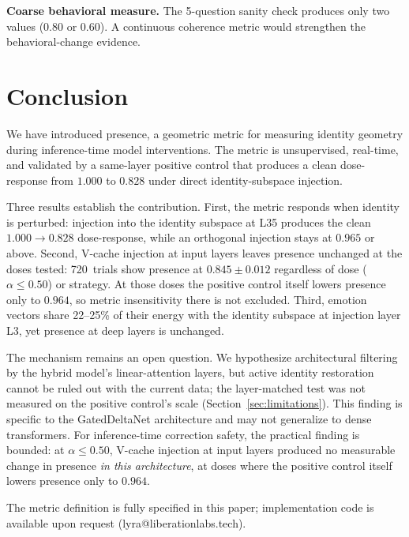\documentclass[11pt,a4paper]{article}
\begin{document}
\textbf{Coarse behavioral measure.} The 5-question sanity check produces
only two values (0.80 or 0.60). A continuous coherence metric would
strengthen the behavioral-change evidence.

\section{Conclusion}
\label{sec:conclusion}

We have introduced presence, a geometric metric for measuring identity
geometry during inference-time model interventions. The metric is
unsupervised, real-time, and validated by a same-layer positive control
that produces a clean dose-response from $1.000$ to $0.828$ under direct
identity-subspace injection.

Three results establish the contribution. First, the metric responds
when identity is perturbed: injection into the identity subspace at L35
produces the clean $1.000 \to 0.828$ dose-response, while an orthogonal
injection stays at $0.965$ or above. Second, V-cache injection at input
layers leaves presence unchanged at the doses tested: 720~trials show
presence at $0.845 \pm 0.012$ regardless of dose ($\alpha \le 0.50$) or
strategy. At those doses the positive control itself lowers presence
only to $0.964$, so metric insensitivity there is not excluded. Third,
emotion vectors share 22--25\% of their energy with the identity subspace
at injection layer L3, yet presence at deep layers is unchanged.

The mechanism remains an open question. We hypothesize architectural
filtering by the hybrid model's linear-attention layers, but active
identity restoration cannot be ruled out with the current data; the
layer-matched test was not measured on the positive control's scale
(Section~\ref{sec:limitations}). This finding is specific to the GatedDeltaNet
architecture and may not generalize to dense transformers. For
inference-time correction safety, the practical finding is bounded: at
$\alpha \le 0.50$, V-cache injection at input layers produced no
measurable change in presence \emph{in this architecture}, at doses where
the positive control itself lowers presence only to $0.964$.

The metric definition is fully specified in this paper; implementation
code is available upon request (lyra@liberationlabs.tech).

\end{document}
